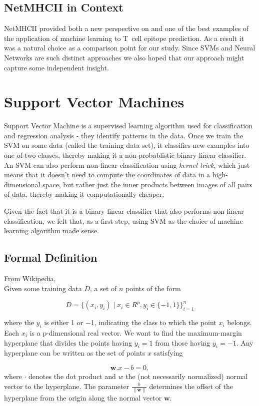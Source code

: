 \documentclass[journal]{IEEEtran}
\begin{document}
\subsection{NetMHCII in Context}
NetMHCII provided both a new perspective on and one of the best examples of the application of machine learning to T~cell epitope prediction.  As a result it was a natural choice as a comparison point for our study.  Since SVMs and Neural Networks are such distinct approaches we also hoped that our approach might capture some independent insight.


\section{Support Vector Machines}
Support Vector Machine is a supervised learning algorithm used for classification and regression analysis - they identify patterns in the data. Once we train the SVM on some data (called the training data set), it classifies new examples into one of two classes, thereby making it a non-probablistic binary linear classifier. An SVM can also perform non-linear classification using \textit{kernel trick}, which just means that it doesn't need to compute the coordinates of data in a high-dimensional space, but rather just the inner products between images of all pairs of data, thereby making it computationally cheaper. 

Given the fact that it is a binary linear classifier that also performs non-linear classification, we felt that, as a first step, using SVM as the choice of machine learning algorithm made sense. 

\subsection{Formal Definition}

From Wikipedia,\\ 
Given some training data $D$, a set of $n$ points of the form 

$$
D =   \lbrace \left(x_{i}, y_{i}\right) \mid x_{i} \in R^{p}, y_{i} \in \lbrace-1, 1\rbrace\rbrace_{i=1}^n     
$$
    
where the $y_i$ is either 1 or −1, indicating the class to which the point $x_i$ belongs. Each $x_i$ is a p-dimensional real vector. We want to find the maximum-margin hyperplane that divides the points having $y_i=1$ from those having $y_i=-1$. Any hyperplane can be written as the set of points $x$ satisfying 

$$
\mathbf{w}.x - b = 0,
$$
where $\cdot$ denotes the dot product and $w$ the (not necessarily normalized) normal vector to the hyperplane. The parameter $\tfrac{b}{\|\mathbf{w}\|}$ determines the offset of the hyperplane from the origin along the normal vector ${\mathbf{w}}$.\\
\end{document}
